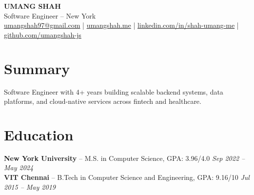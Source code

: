 \documentclass[10pt]{article}
\newcommand{\BodyTextSize}{\fontsize{10.5pt}{11.25pt}\selectfont}
\begin{document}
\begin{center}
{\LARGE \textbf{UMANG SHAH}}\\[-1pt]
Software Engineer -- New York\\[-1pt]
\BodyTextSize \href{mailto:umangshah97@gmail.com}{umangshah97@gmail.com} \;|\; \href{https://umangshah.me}{umangshah.me} \;|\; \href{https://www.linkedin.com/in/shah-umang-me}{linkedin.com/in/shah-umang-me} \;|\; \href{https://github.com/umangshah-js}{github.com/umangshah-js}
\end{center}

\vspace{-8pt}
\BodyTextSize

\section*{Summary}
Software Engineer with 4+ years building scalable backend systems, data platforms, and cloud-native services across fintech and healthcare.

\vspace{0pt}

\section*{Education}
\textbf{New York University} -- M.S. in Computer Science, GPA: 3.96/4.0 \hfill \textit{Sep 2022 -- May 2024} \\
\textbf{VIT Chennai} -- B.Tech in Computer Science and Engineering, GPA: 9.16/10 \hfill \textit{Jul 2015 -- May 2019}

\vspace{0pt}
\end{document}

